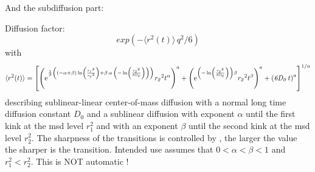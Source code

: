 \documentclass[11pt,fleqn]{book} %
\begin{document}
And the subdiffusion part:

\begin{exercise}
Diffusion factor:
\begin{equation}
exp\left (-\langle r^2(t) \rangle \, q^2/6 \right)
\end{equation}
with
\begin{equation}
\label{eq:subdiff2}
\langle r^2(t) \rangle = \left [
{ \left( {{\rm e}^{{\frac {1}{\beta} \left(  \left( -\alpha+
\beta \right) \ln  \left( {\frac {{{\it r_1}}^{2}}{{{\it r_2}}^{2}}}
 \right) +\beta\,\alpha\, \left(  -\ln  \left( {\frac {{{\it r_2}}^{2}}{{\it 6 D_0}}} \right) 
 \right)  \right) }}}{{\it r_2}}^{2}{t}^{\alpha} \right) ^{a}+
 \left( {{\rm e}^{ \left(  -\ln  \left( {\frac {{{\it r_2}}^{2}}{{\it 6 D_0}}} \right) 
 \right) \beta}}{{\it r_2}}^{2}{t}^{\beta} \right) ^{a}+
 \left( {\it 6 D_0}\,t \right) ^{a}} \right ]^{1/a}
\end{equation}
describing sublinear-linear center-of-mass diffusion with a normal long time diffusion constant
${D_0}$ and a sublinear diffusion with exponent ${\alpha}$ until the first kink at the msd level
${r_1^2}$ and with an exponent ${\beta}$ until the second kink at the msd level ${r_2^2}$. 
The sharpness of the transitions is controlled by , the larger the value the sharper is the transition.
Intended use assumes that ${0 < \alpha < \beta < 1}$  and ${r_1^2 < r_2^2}$. 
This is NOT automatic !
\end{exercise}
\end{document}
